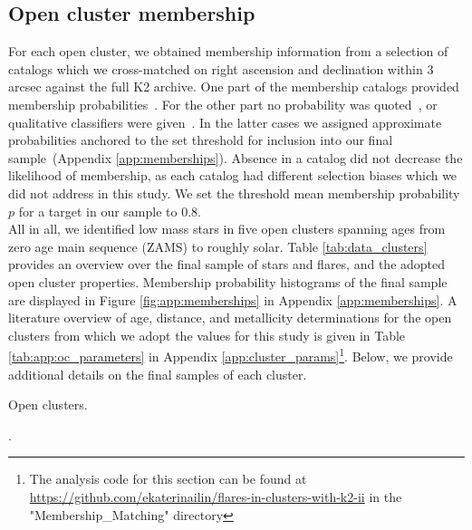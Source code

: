 \documentclass{aa}
\begin{document}
\subsection{Open cluster membership}
\label{sec:sec:ocmem}
For each open cluster, we obtained membership information from a selection of catalogs which we cross-matched on right ascension and declination within 3 arcsec against the full K2 archive. One part of the membership catalogs provided membership probabilities~\citep{douglas_praesepe_hyades_2014, cantat_gaudin_2018, olivares_pleiades_2018, reino_hyades_2018, gao_m67mem_2018, olivares_ngc6774_2019}. For the other part no probability was quoted~\citep{rebull_pleiadesrot_2016, douglas_poking_2017, gaia_dr2_2018_hrd}, or qualitative classifiers were given~\citep{curtis2013, gonzalez_m67mem_2016,rebull_praesepe_2017}. In the latter cases we assigned approximate probabilities anchored to the set threshold for inclusion into our final sample~(Appendix \ref{app:memberships}). Absence in a catalog did not decrease the likelihood of membership, as each catalog had different selection biases which we did not address in this study. We set the threshold mean membership probability $p$ for a target in our sample to 0.8. 
\\
All in all, we identified low mass stars in five open clusters spanning ages from zero age main sequence (ZAMS) to roughly solar. Table \ref{tab:data_clusters} provides an overview over the final sample of stars and flares, and the adopted open cluster properties. Membership probability histograms of the final sample are displayed in Figure \ref{fig:app:memberships} in Appendix \ref{app:memberships}. A literature overview of age, distance, and metallicity determinations for the open clusters from which we adopt the values for this study is given in Table \ref{tab:app:oc_parameters} in Appendix \ref{app:cluster_params}\footnote{The analysis code for this section can be found at \url{https://github.com/ekaterinailin/flares-in-clusters-with-k2-ii} in the "Membership\_Matching" directory}. Below, we provide additional details on the final samples of each cluster.
\begin{table}
\caption{Open clusters.}
\label{tab:data_clusters}
\centering

.
\end{table}
\end{document}
